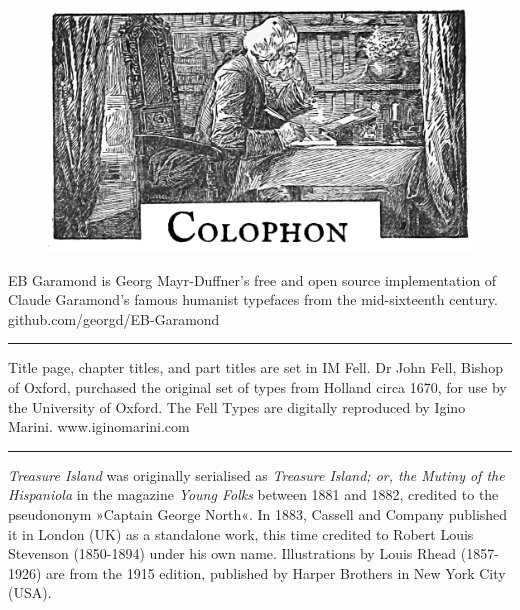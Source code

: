 \documentclass[
paper=5.5in:8.5in,
BCOR=7mm,
twoside,
DIV=calc,
11pt,
usegeometry,
chapterprefix,
headings=big]{scrbook} %
\begin{document}
\chapter*{}
\begin{figure}[t!]
\centering
\includegraphics[width=\linewidth]{colophon}
\end{figure}
\centering
\vspace{-0.8cm}
EB Garamond is Georg Mayr-Duffner's free and open source implementation of Claude Garamond’s famous humanist typefaces from the mid-sixteenth century. github.com/georgd/EB-Garamond

\rule{0.5\textwidth}{.4pt}

Title page, chapter titles, and part titles are set in IM Fell. Dr John Fell, Bishop of Oxford, purchased the original set of types from Holland circa 1670, for use by the University of Oxford. The Fell Types are digitally reproduced by Igino Marini. www.iginomarini.com

%
\rule{0.5\textwidth}{.4pt}

\textit{Treasure Island} was originally serialised as \textit{Treasure Island; or, the Mutiny of the Hispaniola} in the magazine \textit{Young Folks} between 1881 and 1882, credited to the pseudononym »Captain George North«. In 1883, Cassell and Company published it in London (UK) as a standalone work, this time credited to Robert Louis Stevenson (1850-1894) under his own name. Illustrations by Louis Rhead (1857-1926) are from the 1915 edition, published by Harper Brothers in New York City (USA).
\end{document}
